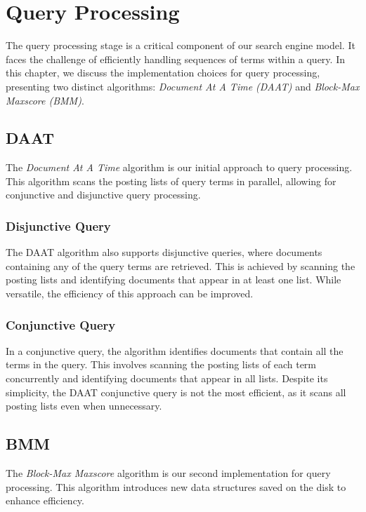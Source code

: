\chapter{Query Processing}

The query processing stage is a critical component of our search engine model. It faces the challenge of efficiently handling 
sequences of terms within a query. In this chapter, we discuss the implementation choices for query processing, presenting two 
distinct algorithms: \textit{Document At A Time (DAAT)} and \textit{Block-Max Maxscore (BMM)}.

\section{DAAT}

The \textit{Document At A Time} algorithm is our initial approach to query processing. This algorithm scans the posting lists of 
query terms in parallel, allowing for conjunctive and disjunctive query processing.

\subsection{Disjunctive Query}

The DAAT algorithm also supports disjunctive queries, where documents containing any of the query terms are retrieved. 
This is achieved by scanning the posting lists and identifying documents that appear in at least one list. While versatile, 
the efficiency of this approach can be improved.

\subsection{Conjunctive Query}

In a conjunctive query, the algorithm identifies documents that contain all the terms in the query. This involves scanning the 
posting lists of each term concurrently and identifying documents that appear in all lists. Despite its simplicity, the DAAT 
conjunctive query is not the most efficient, as it scans all posting lists even when unnecessary.


\section{BMM}

The \textit{Block-Max Maxscore} algorithm is our second implementation for query processing. This algorithm introduces new 
data structures saved on the disk to enhance efficiency.

